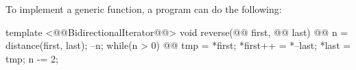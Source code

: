 \pnum
\enterexample
To implement a generic
function, a \Cpp program can do the following:

\begin{codeblock}
template <@@BidirectionalIterator@@>
void reverse(@@ first, @@ last) {
  @@ n =
    distance(first, last);
  --n;
  while(n > 0) {
    @@
      tmp = *first;
    *first++ = *--last;
    *last = tmp;
    n -= 2;
  }
}
\end{codeblock}
\exitexample

